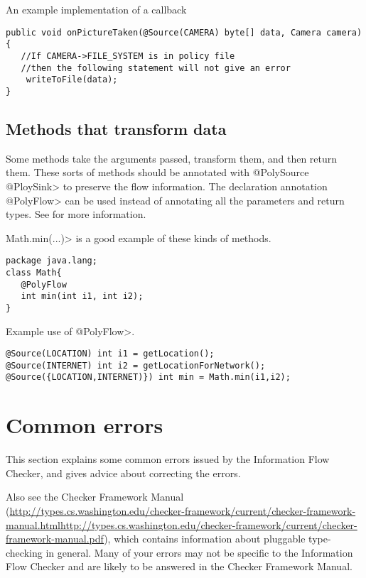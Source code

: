 An example implementation of a callback
\begin{Verbatim}
public void onPictureTaken(@Source(CAMERA) byte[] data, Camera camera){
   //If CAMERA->FILE_SYSTEM is in policy file
   //then the following statement will not give an error
    writeToFile(data);
}
\end{Verbatim}


\subsection{Methods that transform data}

Some methods take the arguments passed, transform them, and then return them.  These sorts of 
methods should be annotated with \<@PolySource @PloySink>
  to preserve the flow information.  The declaration annotation \<@PolyFlow> can be used instead of
  annotating all the parameters and return types. See  for more information. 
  
  \<Math.min(...)> is a good example of these kinds of methods. 
  
  \begin{Verbatim}
package java.lang;
class Math{
   @PolyFlow  
   int min(int i1, int i2);
}
\end{Verbatim}

Example use of \<@PolyFlow>.
\begin{Verbatim}
@Source(LOCATION) int i1 = getLocation();
@Source(INTERNET) int i2 = getLocationForNetwork();
@Source({LOCATION,INTERNET)}) int min = Math.min(i1,i2);
 \end{Verbatim}

\section{Common errors\label{errors}}

This section explains some common errors issued by the Information Flow Checker, and
gives advice about correcting the errors.   

Also see the Checker Framework Manual
(\ifhevea\url{http://types.cs.washington.edu/checker-framework/current/checker-framework-manual.html}\else\url{http://types.cs.washington.edu/checker-framework/current/checker-framework-manual.pdf}\fi),
which contains information about pluggable type-checking in general.  Many
of your errors may not be specific to the Information Flow Checker and are likely to be
answered in the Checker Framework Manual.

